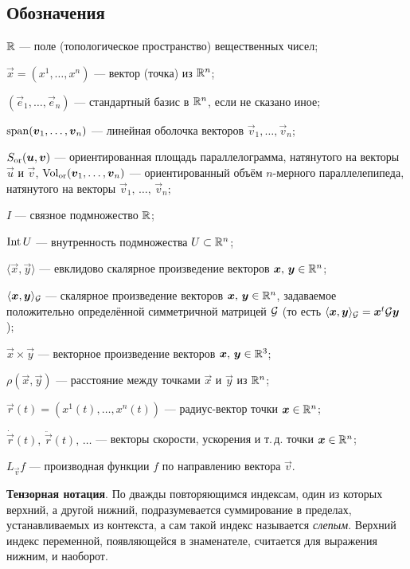 \subsection*{Обозначения}

\begin{center}
	\begin{minipage}{.9\textwidth}
		$\mathbb{R}$ --- поле (топологическое пространство) вещественных чисел;

		$\vec{x} = (x^1, \ldots, x^n)$ --- вектор (точка) из $\mathbb{R}^n$;
		
		$(\vec{e}_1, \ldots, \vec{e}_n)$ --- стандартный базис в $\mathbb{R}^n$, если не сказано иное;

		$\operatorname{span}(\boldsymbol{v}_1, \ldots, \boldsymbol{v}_n)$ --- линейная оболочка векторов $\vec{v}_1, \ldots, \vec{v}_n$;

		$S_{\mathrm{or}}(\boldsymbol{u}, \boldsymbol{v})$ --- ориентированная площадь параллелограмма, натянутого на векторы $\vec{u}$ и $\vec{v}$, $\operatorname{Vol}_{\mathrm{or}}(\boldsymbol{v}_1, \ldots, \boldsymbol{v}_n)$ --- ориентированный объём $n$-мерного параллелепипеда, натянутого на векторы $\vec{v}_1,\,\ldots,\,\vec{v}_n$;

		$I$ --- связное подмножество $\mathbb{R}$;

		$\operatorname{Int} U$ --- внутренность подмножества $U \subset \mathbb{R}^n$;

		$\langle\vec{x}, \vec{y}\rangle$ --- евклидово скалярное произведение векторов $\boldsymbol{x},\,\boldsymbol{y} \in \mathbb{R}^n$;

		$\langle\boldsymbol{x}, \boldsymbol{y}\rangle_{\mathcal{G}}$ --- скалярное произведение векторов $\boldsymbol{x},\,\boldsymbol{y} \in \mathbb{R}^n$, задаваемое положительно определённой симметричной матрицей $\mathcal{G}$ (то есть $\langle\boldsymbol{x}, \boldsymbol{y}\rangle_{\mathcal{G}} = \boldsymbol{x}^t\mathcal{G}\boldsymbol{y}$);

		$\vec{x} \times \vec{y}$ --- векторное произведение векторов $\boldsymbol{x},\,\boldsymbol{y} \in \mathbb{R}^3$;

		$\rho(\vec{x}, \vec{y})$ --- расстояние между точками $\vec{x}$ и $\vec{y}$ из $\mathbb{R}^n$;

		$\vec{r}(t) = (x^1(t), \ldots, x^n(t))$ --- радиус-вектор точки $\boldsymbol{x} \in \mathbb{R}^n$;

		$\dot{\vec{r}}(t),\,\ddot{\vec{r}}(t),\,\ldots$ --- векторы скорости, ускорения и т.\,д. точки $\boldsymbol{x} \in \mathbb{R}^n$;

		$L_{\vec{v}}f$ --- производная функции $f$ по направлению вектора $\vec{v}$.

		\medskip
		\textbf{Тензорная нотация}. {\small По дважды повторяющимся индексам, один из которых верхний, а другой нижний, подразумевается суммирование в пределах, устанавливаемых из контекста, а сам такой индекс называется \textit{слепым}. Верхний индекс переменной, появляющейся в знаменателе, считается для выражения нижним, и наоборот.}
	\end{minipage}
\end{center}

